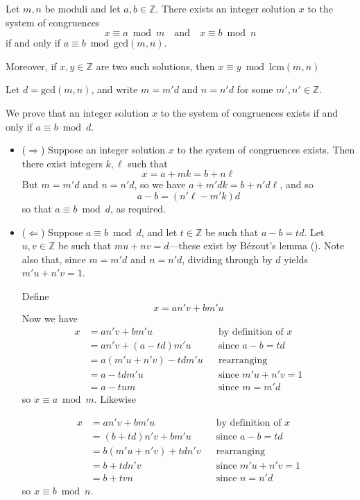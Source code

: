\begin{theorem}
\label{thmCRTGeneral}
Let $m,n$ be moduli and let $a,b \in \mathbb{Z}$. There exists an integer solution $x$ to the system of congruences
\[ x \equiv a \bmod m \quad \text{and} \quad x \equiv b \bmod n \]
if and only if $a \equiv b \bmod \mathrm{gcd}(m,n)$.

Moreover, if $x,y \in \mathbb{Z}$ are two such solutions, then $x \equiv y \bmod{\mathrm{lcm}(m,n)}$
\end{theorem}
\begin{cproof}
Let $d=\mathrm{gcd}(m,n)$, and write $m=m'd$ and $n=n'd$ for some $m',n' \in \mathbb{Z}$.

We prove that an integer solution $x$ to the system of congruences exists if and only if $a \equiv b \bmod d$.

\begin{itemize}
\item ($\Rightarrow$) Suppose an integer solution $x$ to the system of congruences exists. Then there exist integers $k, \ell$ such that
\[ x = a+mk = b+n\ell \]
But $m=m'd$ and $n=n'd$, so we have $a+m'dk=b+n'd\ell$, and so
\[ a-b = (n'\ell - m'k)d \]
so that $a \equiv b \bmod d$, as required.

\item ($\Leftarrow$) Suppose $a \equiv b \bmod d$, and let $t \in \mathbb{Z}$ be such that $a-b=td$. Let $u,v \in \mathbb{Z}$ be such that $mu+nv=d$---these exist by B\'{e}zout's lemma (). Note also that, since $m=m'd$ and $n=n'd$, dividing through by $d$ yields $m'u+n'v=1$.

Define
\[ x = an'v+bm'u \]
Now we have
\begin{align*}
x &= an'v + bm'u && \text{by definition of $x$} \\
&= an'v + (a-td)m'u && \text{since $a-b=td$} \\
&= a(m'u+n'v) - tdm'u && \text{rearranging} \\
&= a - tdm'u && \text{since $m'u+n'v=1$} \\
&= a - tum && \text{since $m=m'd$}
\end{align*}
so $x \equiv a \bmod m$. Likewise

\begin{align*}
x &= an'v+bm'u && \text{by definition of $x$} \\
&= (b+td)n'v + bm'u && \text{since $a-b=td$} \\
&= b(m'u+n'v) + tdn'v && \text{rearranging} \\
&= b + tdn'v && \text{since $m'u+n'v=1$} \\
&= b + tvn && \text{since $n=n'd$}
\end{align*}
so $x \equiv b \bmod n$.


\end{itemize}
\end{cproof}
